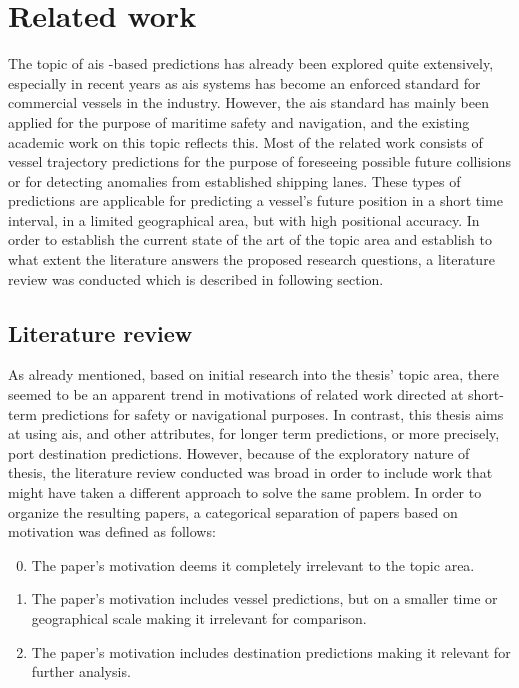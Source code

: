 \chapter{Related work}
\label{chap:related_work}

The topic of \acrfull{ais} -based predictions has already been explored quite extensively, especially in recent years as \acrshort{ais} systems has become an enforced standard for commercial vessels in the industry. However, the \acrshort{ais} standard has mainly been applied for the purpose of maritime safety and navigation, and the existing academic work on this topic reflects this. Most of the related work consists of vessel trajectory predictions for the purpose of foreseeing possible future collisions or for detecting anomalies from established shipping lanes. These types of predictions are applicable for predicting a vessel's future position in a short time interval, in a limited geographical area, but with high positional accuracy. In order to establish the current state of the art of the topic area and establish to what extent the literature answers the proposed research questions, a literature review was conducted which is described in following section.

\section{Literature review}
\label{sec:lit_review}

As already mentioned, based on initial research into the thesis' topic area, there seemed to be an apparent trend in motivations of related work directed at short-term predictions for safety or navigational purposes. In contrast, this thesis aims at using \acrshort{ais}, and other attributes, for longer term predictions, or more precisely, port destination predictions. However, because of the exploratory nature of thesis, the literature review conducted was broad in order to include work that might have taken a different approach to solve the same problem. In order to organize the resulting papers, a categorical separation of papers based on motivation was defined as follows:

\begin{enumerate}
\setcounter{enumi}{-1}
    \item The paper's motivation deems it completely irrelevant to the topic area.
    \item The paper's motivation includes vessel predictions, but on a smaller time or geographical scale making it irrelevant for comparison.
    \item The paper's motivation includes destination predictions making it relevant for further analysis.
\end{enumerate}

